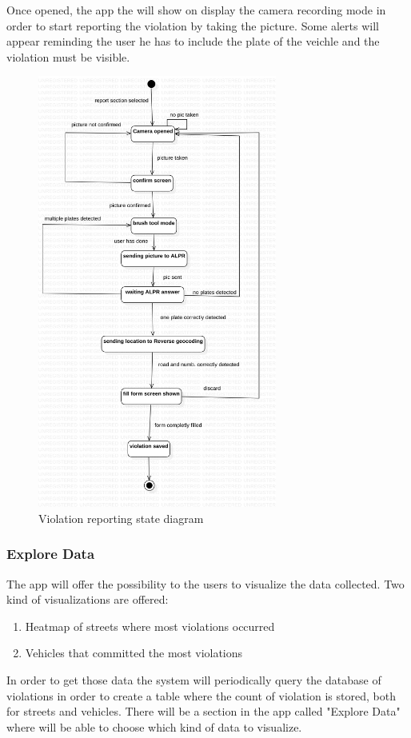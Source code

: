 Once opened, the app the will show on display the camera recording mode in order to start reporting the violation by taking the picture. Some alerts will appear reminding the user he has to include the plate of the veichle and the violation must be visible.
\begin{figure}
\centering
\includegraphics[width=0.7\textwidth]{Images/violationstate.png}
\caption{\label{fig:violationstatediag} Violation reporting state diagram}
\end{figure}

\subsubsection{Explore Data}
The app will offer the possibility to the users to visualize the data collected.
Two kind of visualizations are offered:
\begin{enumerate}
  \item Heatmap of streets where most violations occurred
  \item Vehicles that committed the most violations \label{blacklistplates}
\end{enumerate}
In order to get those data the system will periodically query the database of violations in order to create a table where the count of violation is stored, both for streets and vehicles.
There will be a section in the app called "Explore Data" where will be able to choose which kind of data to visualize.

